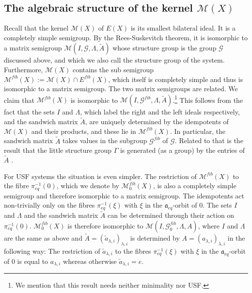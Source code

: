 \documentclass[12pt]{amsart}
\theoremstyle{definition}
\numberwithin{equation}{section}
\newcommand{\Gg}{{\mathcal G}}
\newcommand{\aut}{{\mathfrak a}}
\newcommand{\aute}{\aut_{eq}}
\newcommand{\pe}{\pi_{eq}}
\newcommand{\M}{\mathcal M}
\newcommand{\Ef}{E^{fib}}
\begin{document}
\subsection{The algebraic structure of the kernel $\M(X)$}
Recall that the kernel $\M(X)$ of $E(X)$ is its smallest bilateral ideal. It is a completely simple semigroup. By the Rees-Suskevitch theorem, it is isomorphic to a matrix semigroup $\M(I,\Gg,\Lambda,\tilde A)$ whose structure group is the group $\Gg$ discussed above, and which we also call  the structure group of the system. Furthermore,  $\M(X)$ contains the sub semigroup $\M^{fib}(X):=\M(X)\cap \Ef(X)$, which itself is completely simple and thus is isomorphic to a matrix semigroup. The two matrix semigroups are related. We claim that $\M^{fib}(X)$ is isomorphic to 
$\M(I,\Gg^{fib},\Lambda,\tilde A)$.\footnote{We mention that this result needs neither minimality nor USF.}  This follows from the fact that the 
sets $I$ and $\Lambda$, which label the right and the left ideals respectively, and the sandwich matrix $\tilde A$, are uniquely determined by the idempotents of $\M(X)$ and their products, and these lie in $\M^{fib}(X)$. In particular, the sandwich matrix $\tilde A$ takes values in the subgroup $\Gg^{fib}$ of $\Gg$. Related to that is the result that the little structure group $\Gamma$ is generated (as a group) by the entries of $\tilde A$ \cite{ESBS}.

For USF systems %
the situation is even simpler. The restriction of $\M^{fib}(X)$ to the fibre $\pe^{-1}(0)$, which we denote by $\M_0^{fib}(X)$, is also a completely simple semigroup and therefore isomorphic to a matrix semigroup. The idempotents act non-trivially only on the fibres $\pe^{-1}(\xi)$ with $\xi$ in the $\aute$-orbit of $0$. The sets $I$ and $\Lambda$ and the sandwich matrix $\tilde A$ can be determined through their action on $\pe^{-1}(0)$. $\M_0^{fib}(X)$ is therefore isomorphic to 
$\M(I,\Gg^{fib}_0,\Lambda,A)$, where $I$ and $\Lambda$ are the same as above and $\tilde A=(\tilde a_{\lambda,i})_{\lambda,i}$ is determined by $A=(a_{\lambda,i})_{\lambda,i}$ in the following way:
The restriction of  $\tilde a_{\lambda,i}$ to the fibres $\pe^{-1}(\xi)$ with $\xi$ in the $\aute$-orbit of $0$ is equal to $a_{\lambda,i}$ whereas otherwise 
$\tilde a_{\lambda,i}=e$.
\end{document}
